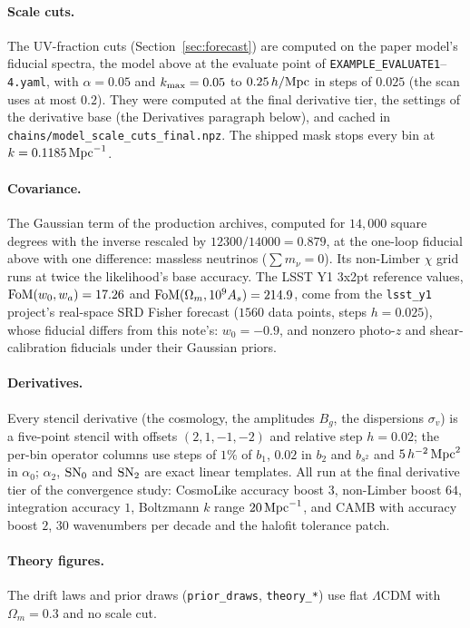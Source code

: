 \documentclass[11pt]{article}
\newcommand{\kmax}{k_{\rm max}}
\newcommand{\hMpc}{\,h/{\rm Mpc}}
\newcommand{\bstwo}{b_{s^2}}
\newcommand{\aunit}{\,h^{-2}\,{\rm Mpc}^2}
\newcommand{\SNz}{{\rm SN}_0}
\newcommand{\SNt}{{\rm SN}_2}
\begin{document}
\paragraph{Scale cuts.}
The UV-fraction cuts (Section~\ref{sec:forecast}) are computed on the
paper model's fiducial spectra, the model above at the evaluate point
of \texttt{EXAMPLE\_EVALUATE1}--\texttt{4.yaml}, with $\alpha = 0.05$
and $\kmax = 0.05$ to $0.25\hMpc$ in steps of $0.025$ (the scan uses
at most $0.2$).  They were computed at the final derivative tier,
the settings of the derivative base (the Derivatives paragraph
below), and cached in \texttt{chains/model\_scale\_cuts\_final.npz}.
The shipped mask stops every bin at
$k = 0.1185\,{\rm Mpc}^{-1}$.

\paragraph{Covariance.}
The Gaussian term of the production archives, computed for $14{,}000$
square degrees with the inverse rescaled by $12300/14000 = 0.879$, at
the one-loop fiducial above with one difference: massless neutrinos
($\sum m_\nu = 0$).  Its non-Limber $\chi$ grid runs at twice the
likelihood's base accuracy.  The LSST Y1 3x2pt reference values,
${\rm FoM}(w_0, w_a) = 17.26$ and
${\rm FoM}(\Omega_m, 10^9 A_s) = 214.9$, come from the
\texttt{lsst\_y1} project's real-space SRD Fisher forecast ($1560$
data points, steps $h = 0.025$), whose fiducial differs from this
note's: $w_0 = -0.9$, and nonzero photo-$z$ and shear-calibration
fiducials under their Gaussian priors.

\paragraph{Derivatives.}
Every stencil derivative (the cosmology, the amplitudes $B_g$, the
dispersions $\sigma_v$) is a five-point stencil with offsets
$(2, 1, -1, -2)$ and relative step $h = 0.02$; the per-bin operator
columns use steps of $1\%$ of $b_1$, $0.02$ in $b_2$ and $\bstwo$ and
$5\aunit$ in $\alpha_0$; $\alpha_2$, $\SNz$ and $\SNt$ are exact
linear templates.  All run at the final derivative tier of the
convergence study: CosmoLike accuracy boost $3$, non-Limber boost $64$,
integration accuracy $1$, Boltzmann $k$ range $20\,{\rm Mpc}^{-1}$, and
CAMB with accuracy boost $2$, $30$ wavenumbers per decade and the
halofit tolerance patch.

\paragraph{Theory figures.}
The drift laws and prior draws (\texttt{prior\_draws},
\texttt{theory\_*}) use flat $\Lambda$CDM with $\Omega_m = 0.3$ and no
scale cut.
\end{document}
